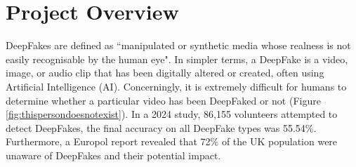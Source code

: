 
\section{Project Overview}
\label{sec:project-review}

DeepFakes are defined as ``manipulated or synthetic media whose realness is not easily recognisable by the human eye"\cite{altuncu2024deepfake}. In simpler terms, a DeepFake is a video, image, or audio clip that has been digitally altered or created, often using Artificial Intelligence (AI). Concerningly, it is extremely difficult for humans to determine whether a particular video has been DeepFaked or not (Figure \ref{fig:thispersondoesnotexist}). In a 2024 study, 86,155 volunteers attempted to detect DeepFakes, the final accuracy on all DeepFake types was 55.54\%\cite{diel2024human}. Furthermore, a Europol report revealed that 72\% of the UK population were unaware of DeepFakes and their potential impact\cite{europol2022facing}.

